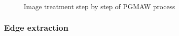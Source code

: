 \documentclass[12pt]{iopart}
\begin{document}
\begin{figure}[h!]
\begin{center}
\\
\end{center}
\caption{{\small Image treatment step by step of PGMAW process}}
\label{fig::photo-macro-drop}
\end{figure}


\subsubsection{Edge extraction}
\label{edge_extraction}
\end{document}
